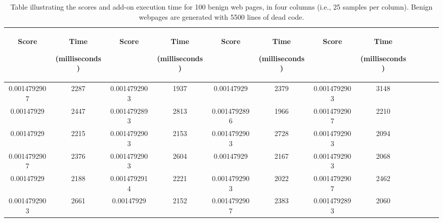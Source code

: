 \begin{table}[h]
     \caption[Scores table of benign web pages]{Table illustrating the scores and add-on execution time for 100 benign web pages, in four columns (i.e., 25 samples per column). Benign webpages are generated with 5500 lines of dead code.}
     \label{tab:b5500table}
  \centering
  \begin{tabular}{|c|c|c|c|c|c|c|c|c|c|c|c|} 
  \midrule
 \begin{sideways}Score\end{sideways}& \begin{sideways}Time\end{sideways} \begin{sideways} (milliseconds)\end{sideways}& \begin{sideways}Score\end{sideways}& \begin{sideways}Time\end{sideways}  \begin{sideways}(milliseconds)\end{sideways}& \begin{sideways}Score\end{sideways}& \begin{sideways}Time\end{sideways}  \begin{sideways}(milliseconds)\end{sideways}& \begin{sideways}Score\end{sideways}& \begin{sideways}Time\end{sideways}  \begin{sideways} (milliseconds)\end{sideways}\\
\midrule
0.0014792907&2287&0.0014792903&1937&0.00147929&2379&0.0014792903&3148\\
\midrule
0.00147929&2447&0.0014792893&2813&0.0014792896&1966&0.0014792907&2210\\
\midrule
0.00147929&2215&0.0014792903&2153&0.0014792903&2728&0.0014792903&2094\\
\midrule
0.0014792907&2376&0.0014792903&2604&0.00147929&2167&0.0014792903&2068\\
\midrule
0.00147929&2188&0.0014792914&2221&0.0014792903&2022&0.0014792907&2462\\
\midrule
0.0014792903&2661&0.00147929&2152&0.0014792907&2383&0.0014792893&2060\\

\end{tabular}
\end{table}
